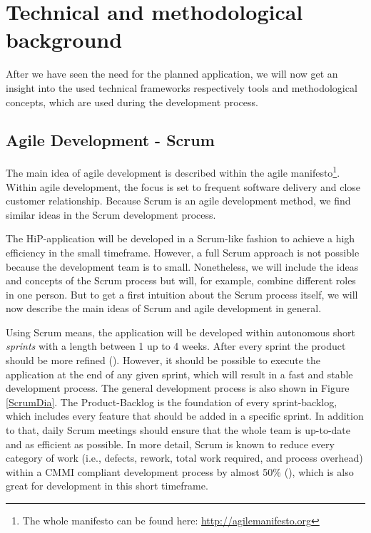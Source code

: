 \chapter[Technical and methodological background]{Technical and methodological background}
After we have seen the need for the planned application, we will now get an insight into the used technical frameworks respectively tools and methodological concepts, which are used during the development process.  

\section{Agile Development - Scrum}
\label{SCRUM-intro}
The main idea of agile development is described within the agile manifesto\footnote{The whole manifesto can be found here: \url{http://agilemanifesto.org}}. Within agile development, the focus is set to frequent software delivery and close customer relationship. Because Scrum is an agile development method, we find similar ideas in the Scrum development process.

The HiP-application will be developed in a Scrum-like fashion to achieve a high efficiency in the small timeframe. However, a full Scrum approach is not possible because the development team is to small. Nonetheless, we will include the ideas and concepts of the Scrum process but will, for example, combine different roles in one person. But to get a first intuition about the Scrum process itself, we will now describe the main ideas of Scrum and agile development in general.

Using Scrum means, the application will be developed within autonomous short \textit{sprints} with a length between 1 up to 4 weeks. After every sprint the product should be more refined (\cite{scrum}). However, it should be possible to execute the application at the end of any given sprint, which will result in a fast and stable development process. The general development process is also shown in Figure \ref{ScrumDia}. The Product-Backlog is the foundation of every sprint-backlog, which includes every feature that should be added in a specific sprint. In addition to that, daily Scrum meetings should ensure that the whole team is up-to-date and as efficient as possible. In more detail, Scrum is known to reduce every category of work (i.e., defects, rework, total work required, and process overhead) within a \ac{CMMI} compliant development process by almost 50\% (\cite{Sut09}), which is also great for development in this short timeframe.


